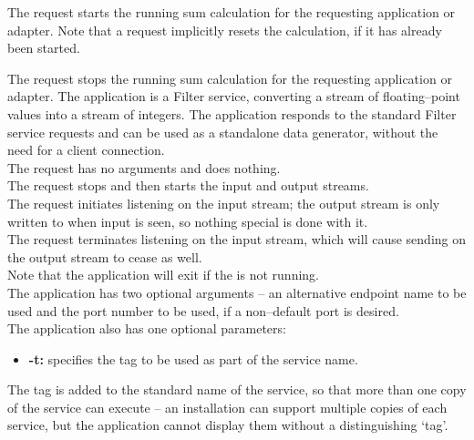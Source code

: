 The  request starts the running sum
calculation for the requesting application or adapter.
Note that a  request implicitly resets the
calculation, if it has already been started.\\
%

The  request stops the running sum
calculation for the requesting application or adapter.
%
The  application is a Filter
service, converting a stream of floating--point values into a stream of integers.
The application responds to the standard Filter service requests and can be used as a
standalone data generator, without the need for a client connection.\\

The  request has no arguments and
does nothing.\\

The  request stops and then
starts the input and output streams.\\

The  request initiates listening
on the input stream; the output stream is only written to when input is seen, so nothing
special is done with it.\\

The  request terminates listening
on the input stream, which will cause sending on the output stream to cease as well.\\

Note that the application will exit if the
 is not running.\\

The application has two optional arguments -- an alternative endpoint name to be used and
the port number to be used, if a non--default port is desired.\\

The application also has one optional parameters:
\begin{itemize}
\item \textbf{-t:} specifies the tag to be used as part of the service name.
\end{itemize}
The tag is added to the standard name of the service, so that more than one copy of the
service can execute -- an \mplusm{} installation can support multiple copies of each
 service, but the 
application cannot display them without a distinguishing `tag'.\\

